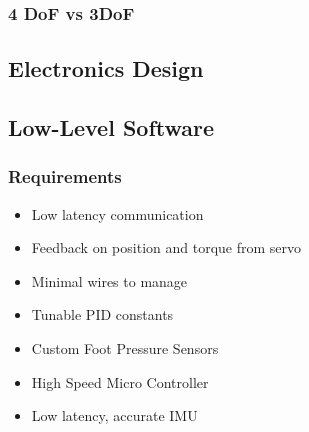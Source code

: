         


        \subsubsection{4 DoF vs 3DoF}

    \subsection{Electronics Design}
\subsection{Low-Level Software}
        \subsubsection{Requirements}
            \begin{itemize} %
                \item Low latency communication
                \item Feedback on position and torque from servo
                \item Minimal wires to manage
                \item Tunable PID constants
                \item Custom Foot Pressure Sensors
                \item High Speed Micro Controller
                \item Low latency, accurate IMU
            \end{itemize}
